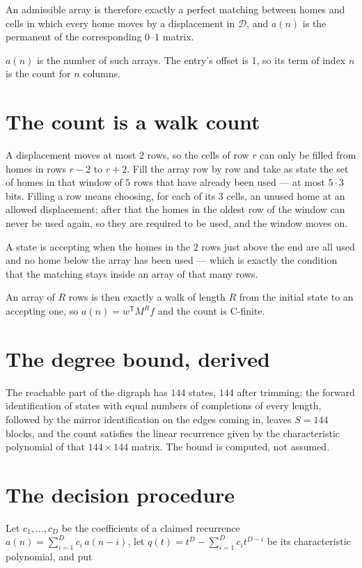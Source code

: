 \documentclass[11pt]{article}
\theoremstyle{definition}
\begin{document}
An admissible array is therefore exactly a perfect matching between homes and cells in which every home moves by a displacement in $\mathcal{D}$, and $a(n)$ is the permanent of the corresponding $0$--$1$ matrix.

$a(n)$ is the number of such arrays. The entry's offset is 1, so its term of index $n$ is the count for $n$ columns.

\section{The count is a walk count}

A displacement moves at most $2$ rows, so the cells of row $r$ can only be filled from homes in rows $r-2$ to $r+2$. Fill the array row by row and take as state the set of homes in that window of $5$ rows that have already been used --- at most $5\cdot3$ bits. Filling a row means choosing, for each of its $3$ cells, an unused home at an allowed displacement; after that the homes in the oldest row of the window can never be used again, so they are required to be used, and the window moves on.

A state is accepting when the homes in the $2$ rows just above the end are all used and no home below the array has been used --- which is exactly the condition that the matching stays inside an array of that many rows.

An array of $R$ rows is then exactly a walk of length $R$ from the initial state to an accepting one, so $a(n) = w^{\mathsf T}M^{R}f$ and the count is C-finite.

\section{The degree bound, derived}

The reachable part of the digraph has $144$ states, $144$ after trimming; the forward identification of states with equal numbers of completions of every length, followed by the mirror identification on the edges coming in, leaves $S = 144$ blocks, and the count satisfies the linear recurrence given by the characteristic polynomial of that $144\times144$ matrix. The bound is computed, not assumed.

\section{The decision procedure}

Let $c_1,\dots,c_D$ be the coefficients of a claimed recurrence $a(n) = \sum_{i=1}^{D} c_i\,a(n-i)$, let $q(t) = t^{D} - \sum_{i=1}^{D} c_i t^{D-i}$ be its characteristic polynomial, and put
\end{document}

